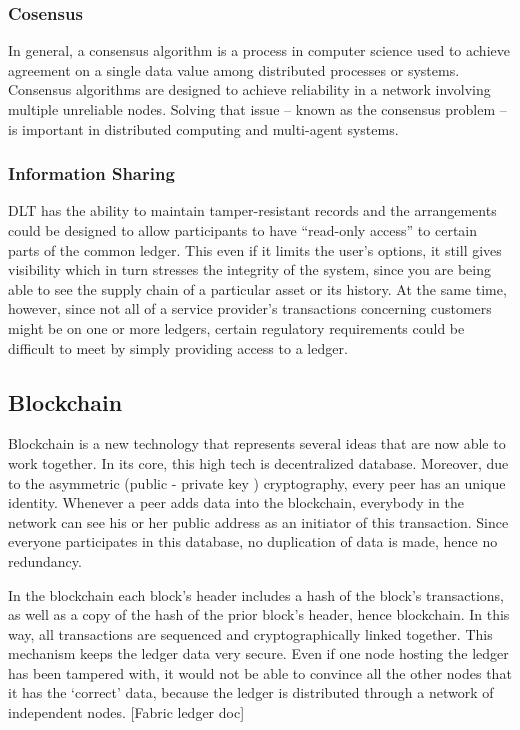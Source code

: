 \documentclass[a4paper,11pt]{report}
\begin{document}
\subsubsection{Cosensus}  
\label{consensus}

In general, a consensus algorithm is a process in computer science used to achieve agreement on a single data value among distributed processes or systems. Consensus algorithms are designed to achieve reliability in a network involving multiple unreliable nodes. Solving that issue – known as the consensus problem – is important in distributed computing and multi-agent systems.\cite{mills2016distributed}

\subsubsection{Information Sharing}  
\label{infosharing}
DLT has the ability to maintain tamper-resistant records and the arrangements could be designed to allow participants to have “read-only access” to certain parts of the common ledger. This even if it limits the user’s options, it still gives visibility which in turn stresses the integrity of the system, since you are being able to see the supply chain of a particular asset or its history. At the same time, however, since not all of a service provider’s transactions concerning customers might be on one or more ledgers, certain regulatory requirements could be difficult to meet by simply providing access to a ledger.\cite{mills2016distributed}

\subsection{Blockchain}
\label{blockchain}

Blockchain is a new technology that represents several ideas that are now able to work together. In its core, this high tech is decentralized database. Moreover, due to the asymmetric (public - private key ) cryptography, every peer has an unique identity. Whenever a peer adds data into the blockchain, everybody in the network can see his or her public address as an initiator of this transaction. Since everyone participates in this database, no duplication of data is made, hence no redundancy. 

In the blockchain each block’s header includes a hash of the block’s transactions, as well as a copy of the hash of the prior block’s header, hence blockchain. In this way, all transactions are sequenced and cryptographically linked together. This mechanism keeps the ledger data very secure. Even if one node hosting the ledger has been tampered with, it would not be able to convince all the other nodes that it has the ‘correct’ data, because the ledger is distributed through a network of independent nodes. [Fabric ledger doc] 
 
\end{document}
